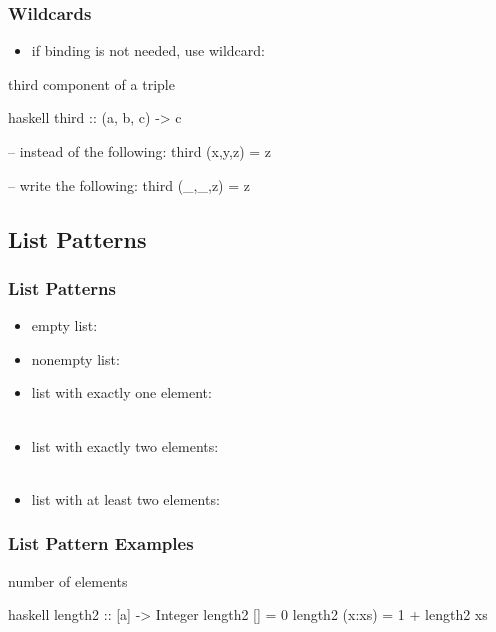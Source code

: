 \documentclass[dvipsnames]{beamer}
\theoremstyle{plain}
\begin{document}
\begin{frame}[fragile]
  \frametitle{Wildcards}

  \begin{itemize}
    \item if binding is not needed, use wildcard: 
  \end{itemize}

  \begin{exampleblock}{third component of a triple}
    \begin{pygments}{haskell}
third :: (a, b, c) -> c

-- instead of the following:
third (x,y,z) = z

-- write the following:
third (_,_,z) = z
    \end{pygments}
  \end{exampleblock}
\end{frame}

\subsection{List Patterns}

\begin{frame}[fragile]
  \frametitle{List Patterns}

  \begin{itemize}
    \item empty list:\\
    \item nonempty list:\\
    \item list with exactly one element:\\
      \\
    \item list with exactly two elements:\\
      \\
    \item list with at least two elements:\\
  \end{itemize}
\end{frame}

\begin{frame}[fragile]
  \frametitle{List Pattern Examples}

  \begin{exampleblock}{number of elements}
    \begin{pygments}{haskell}
length2 :: [a] -> Integer
length2 [] = 0
length2 (x:xs) = 1 + length2 xs
    \end{pygments}
  \end{exampleblock}
\end{frame}
\end{document}
